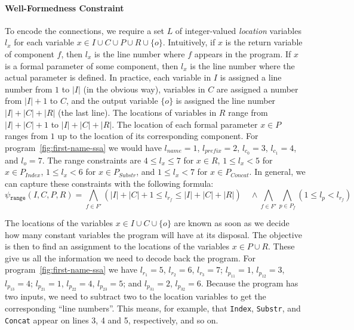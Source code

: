 \paragraph{Well-Formedness Constraint}
\label{sec:wfp-constraint}

To encode the connections, we require a set $L$ of integer-valued
\textit{location} variables $l_x$ for each variable $x \in I \cup C \cup P \cup
R \cup \{o\}$. Intuitively, if $x$ is the return variable of component $f$, then
$l_x$ is the line number where $f$ appears in the program. If $x$ is a formal
parameter of some component, then $l_x$ is the line number where the actual
parameter is defined. In practice, each variable in $I$ is assigned a line
number from $1$ to $|I|$ (in the obvious way), variables in $C$ are assigned
a number from $|I| + 1$ to $C$, and the output variable $\{o\}$ is assigned the
line number $|I| + |C| + |R|$ (the last line). The locations of variables in $R$
range from $|I| + |C| + 1$ to $|I| + |C| + |R|$. The location of each formal
parameter $x \in P$ ranges from $1$ up to the location of its corresponding
component.
For program~\ref{fig:first-name-ssa} we would have
$l_{name} = 1$, $l_{prefix} = 2$,
$l_{c_0} = 3$, $l_{c_1} = 4$,
and $l_o = 7$.
The range constraints are
$4 \leq l_x \leq 7$ for $x \in R$,
$1 \leq l_x < 5$ for $x \in P_{Index}$,
$1 \leq l_x < 6$ for $x \in P_{Substr}$, and
$1 \leq l_x < 7$ for $x \in P_{Concat}$.
In general, we can capture these constraints with the following formula:
%
\[
  \psi{}_{\mathtt{range}}(I, C, P, R) =
  \bigwedge_{f \in F'} (|I| + |C| + 1 \leq l_{r_f} \leq |I| + |C| + |R|)
  \quad \wedge
  \bigwedge_{f \in F'}
  \bigwedge_{p \in P_f} (1 \leq l_p < l_{r_f})
\]

The locations of the variables $x \in I \cup C \cup \{o\}$ are known as soon as
we decide how many constant variables the program will have at its disposal. The
objective is then to find an assignment to the locations of the variables $x \in
P \cup R$. These give us all the information we need to decode back the program.
For program~\ref{fig:first-name-ssa} we have
$l_{r_1} = 5$, $l_{r_2} = 6$, $l_{r_3} = 7$; $l_{p_{11}} = 1$, $l_{p_{12}} = 3$,
$l_{p_{13}} = 4$; $l_{p_{21}} = 1$, $l_{p_{22}} = 4$, $l_{p_{23}} = 5$; and
$l_{p_{31}} = 2$, $l_{p_{32}} = 6$. Because the program has two inputs, we need
to subtract two to the location variables to get the corresponding ``line
numbers''. This means, for example, that \lstinline{Index}, \lstinline{Substr},
and \lstinline{Concat} appear on lines 3, 4 and 5, respectively, and so on.

